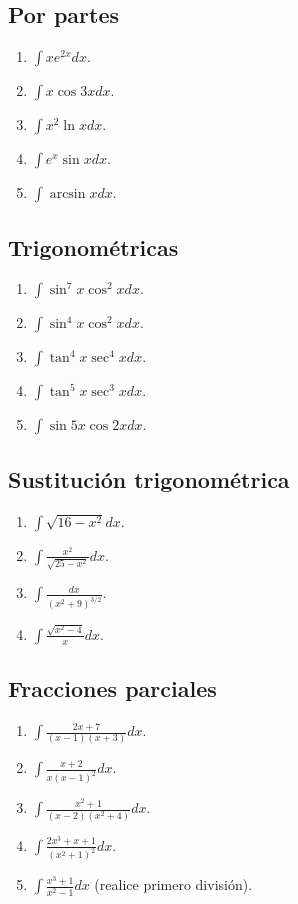 \documentclass[12pt]{article}
\theoremstyle{definition}\newtheorem{definicion}[teorema]{Definición}\newtheorem{ejemplo}[teorema]{Ejemplo}\newtheorem{ejercicio}[teorema]{Ejercicio}
\theoremstyle{remark}\newtheorem*{observacion}{Observación}\newtheorem*{advertencia}{Advertencia}\newtheorem*{estrategia}{Estrategia}
\begin{document}
\subsection*{Por partes}
\begin{enumerate}
\item $\int xe^{2x}dx$.
\item $\int x\cos3x dx$.
\item $\int x^2\ln xdx$.
\item $\int e^x\sin xdx$.
\item $\int\arcsin xdx$.
\end{enumerate}
\subsection*{Trigonométricas}
\begin{enumerate}
\item $\int\sin^7x\cos^2xdx$.
\item $\int\sin^4x\cos^2xdx$.
\item $\int\tan^4x\sec^4xdx$.
\item $\int\tan^5x\sec^3xdx$.
\item $\int\sin5x\cos2xdx$.
\end{enumerate}
\subsection*{Sustitución trigonométrica}
\begin{enumerate}
\item $\int\sqrt{16-x^2}dx$.
\item $\int\frac{x^2}{\sqrt{25-x^2}}dx$.
\item $\int\frac{dx}{(x^2+9)^{3/2}}$.
\item $\int\frac{\sqrt{x^2-4}}{x}dx$.
\end{enumerate}
\subsection*{Fracciones parciales}
\begin{enumerate}
\item $\int\frac{2x+7}{(x-1)(x+3)}dx$.
\item $\int\frac{x+2}{x(x-1)^2}dx$.
\item $\int\frac{x^2+1}{(x-2)(x^2+4)}dx$.
\item $\int\frac{2x^3+x+1}{(x^2+1)^2}dx$.
\item $\int\frac{x^3+1}{x^2-1}dx$ (realice primero división).
\end{enumerate}
\end{document}
